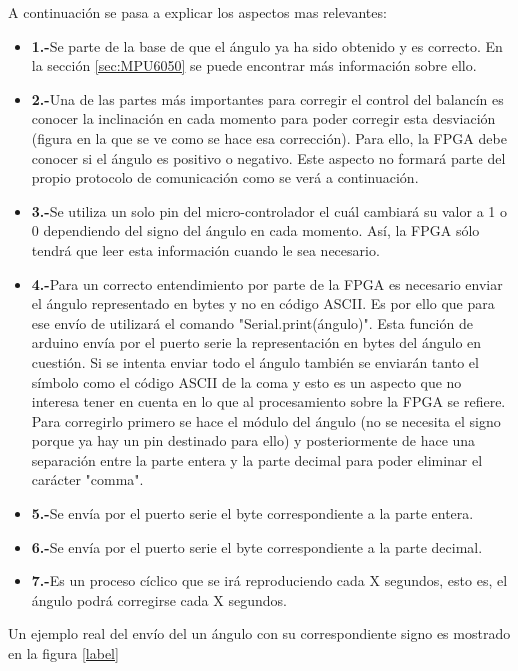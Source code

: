 A continuación se pasa a explicar los aspectos mas relevantes: 

\begin{itemize}
	\item \textbf{1.-}Se parte de la base de que el ángulo ya ha sido obtenido y es correcto. En la sección \ref{sec:MPU6050} se puede encontrar más información sobre ello.
	\item \textbf{2.-}Una de las partes más importantes para corregir el control del balancín es conocer la inclinación en cada momento para poder corregir esta desviación (figura en la que se ve como se hace esa corrección). Para ello, la FPGA debe conocer si el ángulo es positivo o negativo. Este aspecto no formará parte del propio protocolo de comunicación como se verá a continuación.
	\item \textbf{3.-}Se utiliza un solo pin del micro-controlador el cuál cambiará su valor a 1 o 0 dependiendo del signo del ángulo en cada momento. Así, la FPGA sólo tendrá que leer esta información cuando le sea necesario.
	\item \textbf{4.-}Para un correcto entendimiento por parte de la FPGA es necesario enviar el ángulo representado en bytes y no en código ASCII. Es por ello que para ese envío de utilizará el comando "Serial.print(ángulo)". Esta función de arduino envía por el puerto serie la representación en bytes del ángulo en cuestión.\newline
	Si se intenta enviar todo el ángulo también se enviarán tanto el símbolo como el código ASCII de la coma y esto es un aspecto que no interesa tener en cuenta en lo que al procesamiento sobre la FPGA se refiere. Para corregirlo primero se hace el módulo del ángulo (no se necesita el signo porque ya hay un pin destinado para ello) y posteriormente de hace una separación entre la parte entera y la parte decimal para poder eliminar el carácter "comma". 
	
	\item \textbf{5.-}Se envía por el puerto serie el byte correspondiente a la parte entera. 
	\item \textbf{6.-}Se envía por el puerto serie el byte correspondiente a la parte decimal. 
	\item \textbf{7.-}Es un proceso cíclico que se irá reproduciendo cada X segundos, esto es, el ángulo podrá corregirse cada X segundos. 
\end{itemize}
Un ejemplo real del envío del un ángulo con su correspondiente signo es mostrado en la figura \ref{label}

